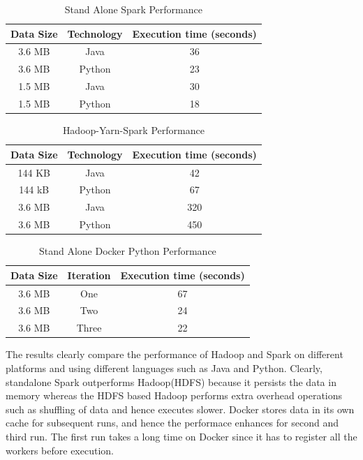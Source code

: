 
% 


\begin{table}[hbt]
\centering
\caption{Stand Alone Spark Performance}\label{t:results-table}
    \begin{tabular}{ | c | c | c |}
    \hline
    Data Size & Technology & Execution time (seconds) \\ \hline
    3.6 MB & Java & 36 \\ \hline
    3.6 MB & Python & 23\\ \hline
    1.5 MB & Java & 30 \\ \hline
    1.5 MB & Python & 18 \\
    \hline
    \end{tabular}
\end{table}


\begin{table}[hbt]
\centering
\caption{Hadoop-Yarn-Spark Performance}\label{t:results-table2}
    \begin{tabular}{ | c | c | c |}
    \hline
    Data Size & Technology & Execution time (seconds) \\ \hline
    144 KB & Java & 42   \\ \hline
    144 kB & Python & 67 \\ \hline
    3.6 MB & Java &  320  \\ \hline
    3.6 MB & Python & 450 \\
    \hline
    \end{tabular} 
\end{table}


\begin{table}[hbt]
\centering
\caption{Stand Alone Docker Python Performance}\label{t:results-table3}
    \begin{tabular}{ | c | c | c |}
    \hline
    Data Size & Iteration & Execution time (seconds) \\ \hline
    3.6 MB & One & 67  \\ \hline
    3.6 MB & Two & 24 \\ \hline
    3.6 MB & Three & 22 \\ \hline
    \end{tabular}
\end{table}


The results clearly compare the performance of Hadoop and Spark 
on different platforms and using different languages such as Java and Python. 
Clearly, standalone Spark outperforms Hadoop(HDFS) because it persists 
 the data in memory whereas the HDFS based Hadoop performs extra overhead 
 operations such as shuffling of data and hence executes slower. 
 Docker stores data in its own cache for subsequent runs, and hence the 
 performace enhances for second and third run. The first run takes a long time 
 on Docker since it has to register all the workers before execution.

